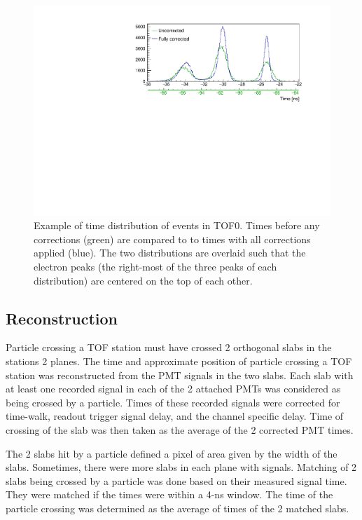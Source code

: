 \begin{figure}[!ht]
  \centering
  \includegraphics[width=0.8\columnwidth]{04_tof0_corrected_vs_uncorrected}
  \caption{Example of time distribution of events in TOF0. Times
    before any corrections (green) are compared to to times with all
    corrections applied (blue). The two distributions are overlaid
    such that the electron peaks (the right-most of the three peaks of
    each distribution) are centered on the top of each other.}
  \label{fig:tof0times}
\end{figure}

\subsection{Reconstruction}

Particle crossing a TOF station must have crossed 2 orthogonal slabs
in the stations 2 planes.  The time and approximate position of
particle crossing a TOF station was reconstructed from the PMT signals
in the two slabs. Each slab with at least one recorded signal in each
of the 2 attached PMTs was considered as being crossed by a
particle. Times of these recorded signals were corrected for
time-walk, readout trigger signal delay, and the channel specific
delay. Time of crossing of the slab was then taken as the average of
the 2 corrected PMT times.

The 2 slabs hit by a particle defined a pixel of area given by the
width of the slabs. Sometimes, there were more slabs in each plane
with signals. Matching of 2 slabs being crossed by a particle was done
based on their measured signal time. They were matched if the times
were within a 4-ns window. The time of the particle crossing was
determined as the average of times of the 2 matched slabs.


